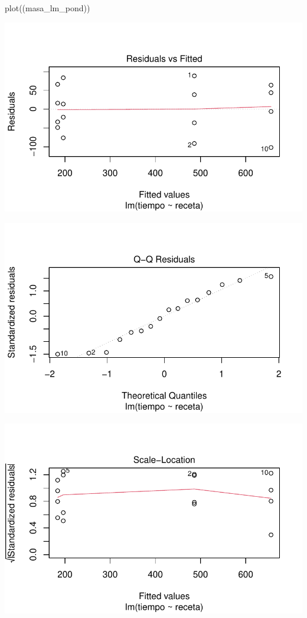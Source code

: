 \documentclass[
  letterpaper,
  DIV=11,
  numbers=noendperiod]{scrartcl}
\newenvironment{Shaded}{\begin{snugshade}}{\end{snugshade}}
\newcommand{\FunctionTok}[1]{\textcolor[rgb]{0.28,0.35,0.67}{#1}}
\newcommand{\NormalTok}[1]{\textcolor[rgb]{0.00,0.23,0.31}{#1}}
\begin{document}
\begin{Shaded}
\begin{Highlighting}[]
\FunctionTok{plot}\NormalTok{((masa\_lm\_pond))}
\end{Highlighting}
\end{Shaded}

\includegraphics{solucion-masa-pizza_files/figure-pdf/modelo-pond-1.pdf}

\includegraphics{solucion-masa-pizza_files/figure-pdf/modelo-pond-2.pdf}

\includegraphics{solucion-masa-pizza_files/figure-pdf/modelo-pond-3.pdf}
\end{document}
